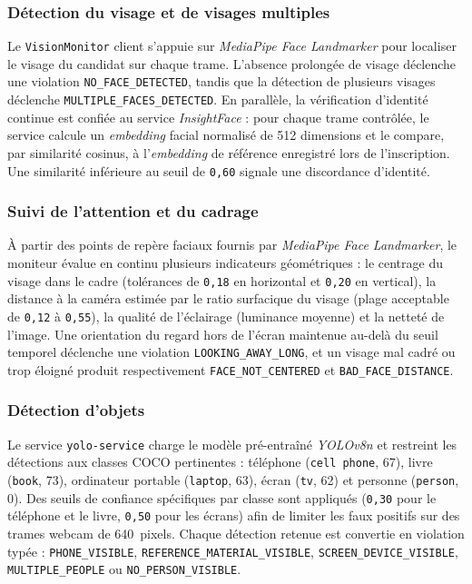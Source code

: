 \subsubsection{Détection du visage et de visages multiples}

Le \texttt{VisionMonitor} client s'appuie sur \textit{MediaPipe Face Landmarker} pour
localiser le visage du candidat sur chaque trame. L'absence prolongée de visage déclenche une
violation \texttt{NO\_FACE\_DETECTED}, tandis que la détection de plusieurs visages déclenche
\texttt{MULTIPLE\_FACES\_DETECTED}. En parallèle, la vérification d'identité continue est
confiée au service \textit{InsightFace} : pour chaque trame contrôlée, le service calcule
un \textit{embedding} facial normalisé de 512 dimensions et le compare, par similarité
cosinus, à l'\textit{embedding} de référence enregistré lors de l'inscription. Une similarité
inférieure au seuil de \texttt{0{,}60} signale une discordance d'identité.

\subsubsection{Suivi de l'attention et du cadrage}

À partir des points de repère faciaux fournis par \textit{MediaPipe Face Landmarker}, le
moniteur évalue en continu plusieurs indicateurs géométriques : le centrage du visage dans le
cadre (tolérances de \texttt{0{,}18} en horizontal et \texttt{0{,}20} en vertical), la
distance à la caméra estimée par le ratio surfacique du visage (plage acceptable de
\texttt{0{,}12} à \texttt{0{,}55}), la qualité de l'éclairage (luminance moyenne) et la
netteté de l'image. Une orientation du regard hors de l'écran maintenue au-delà du seuil
temporel déclenche une violation \texttt{LOOKING\_AWAY\_LONG}, et un visage mal cadré ou trop
éloigné produit respectivement \texttt{FACE\_NOT\_CENTERED} et \texttt{BAD\_FACE\_DISTANCE}.

\subsubsection{Détection d'objets}

Le service \texttt{yolo-service} charge le modèle pré-entraîné \textit{YOLOv8n} et restreint
les détections aux classes COCO pertinentes : téléphone (\texttt{cell phone}, 67), livre
(\texttt{book}, 73), ordinateur portable (\texttt{laptop}, 63), écran (\texttt{tv}, 62) et
personne (\texttt{person}, 0). Des seuils de confiance spécifiques par classe sont appliqués
(\texttt{0{,}30} pour le téléphone et le livre, \texttt{0{,}50} pour les écrans) afin de
limiter les faux positifs sur des trames webcam de 640~pixels. Chaque détection retenue est
convertie en violation typée : \texttt{PHONE\_VISIBLE}, \texttt{REFERENCE\_MATERIAL\_VISIBLE},
\texttt{SCREEN\_DEVICE\_VISIBLE}, \texttt{MULTIPLE\_PEOPLE} ou \texttt{NO\_PERSON\_VISIBLE}.


